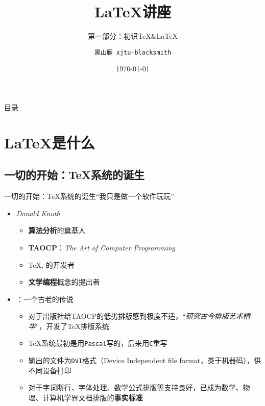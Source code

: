 \documentclass[10pt]{beamer}
\title[钱学森书院学业辅导中心]{\LaTeX 讲座}
\subtitle{第一部分：初识\TeX\&\LaTeX}
\author[黑山雁]{\texttt{黑山雁 xjtu-blacksmith}}
\institute[Xi'an Jiaotong University]
{\textbf{西安交通大学·钱学森书院学业辅导中心}}
\date
{\today}
\begin{document}
\begin{frame}
  \titlepage
\end{frame}

\begin{frame}{目录}
  \tableofcontents
\end{frame}

\section{\LaTeX 是什么}

\subsection{一切的开始：\TeX 系统的诞生}
\begin{frame}{一切的开始：\TeX 系统的诞生}{“我只是做一个软件玩玩”}
\begin{itemize}
    \item \textbf{} \textit{Donald Knuth}
    \begin{itemize}
        \item \textbf{算法分析}的奠基人
        \item \textbf{TAOCP}：\textit{The Art of Computer Programming}
        \item \TeX, \MF 的开发者
        \item \textbf{文学编程}概念的提出者
    \end{itemize}
    \item {}：一个古老的传说
    \begin{itemize}
        \item 对于出版社给TAOCP的低劣排版感到极度不适，“\textit{研究古今排版艺术精华}”，开发了\TeX 排版系统
        \item \TeX 系统最初是用\texttt{Pascal}写的，后来用\texttt{C}重写
        \item 输出的文件为\texttt{DVI}格式（Device Independent file format，类于机器码），供不同设备打印
        \item 对于字词断行、字体处理、数学公式排版等支持良好，已成为数学、物理、计算机学界文档排版的\textbf{事实标准}
    \end{itemize}
\end{itemize}
\end{frame}
\end{document}

